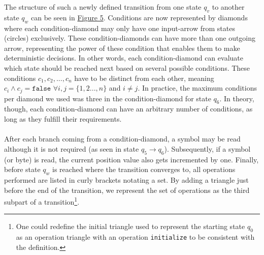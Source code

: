 The structure of such a newly defined transition from one state $q_v$ to another state $q_w$ can be seen in \hyperref[fig:fig-5-transition-netstring-Calc-pda-2]{Figure 5}. Conditions are now represented by diamonds where each condition-diamond may only have one input-arrow from states (circles) exclusively. These condition-diamonds can have more than one outgoing arrow, representing the power of these condition that enables them to make deterministic decisions. In other words, each condition-diamond can evaluate which state should be reached next based on several possible conditions. These conditions $c_1,c_2,...,c_n$ have to be distinct from each other, meaning $c_i \wedge c_j = \texttt{false}$  $\forall i,j = \{1,2...,n\}$ and $i\neq j$. In practice, the maximum conditions per diamond we used was three in the condition-diamond for state $q_6$. In theory, though, each condition-diamond can have an arbitrary number of conditions, as long as they fulfill their requirements.\\\\
After each branch coming from a condition-diamond, a symbol may be read although it is not required (as seen in state $q_5\rightarrow q_6$). Subsequently, if a symbol (or byte) is read, the current position value also gets incremented by one. Finally, before state $q_w$ is reached where the transition converges to, all operations performed are listed in curly brackets notating a set. By adding a triangle just before the end of the transition, we represent the set of operations as the third subpart of a transition\footnote{One could redefine the initial triangle used to represent the starting state $q_0$ as an operation triangle with an operation \texttt{initialize} to be consistent with the definition.}.
